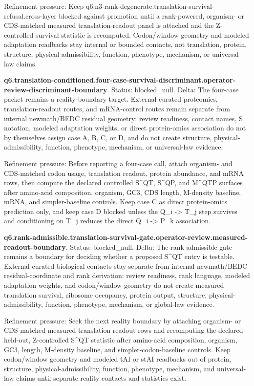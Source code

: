 Refinement pressure: Keep q6.n3-rank-degenerate.translation-survival-refusal.cross-layer blocked against promotion until a rank-powered, organism- or CDS-matched measured translation-readout panel is attached and the Z-controlled survival statistic is recomputed. Codon/window geometry and modeled adaptation readbacks stay internal or bounded contacts, not translation, protein, structure, physical-admissibility, function, phenotype, mechanism, or universal-law claims.

\textbf{q6.translation-conditioned.four-case-survival-discriminant.operator-review-discriminant-boundary}. Status: blocked\_null. Delta: The four-case packet remains a reality-boundary target. External curated proteomics, translation-readout routes, and mRNA-control routes remain separate from internal newmath/BEDC residual geometry: review readiness, contact names, S notation, modeled adaptation weights, or direct protein-omics association do not by themselves assign case A, B, C, or D, and do not create structure, physical-admissibility, function, phenotype, mechanism, or universal-law evidence.

Refinement pressure: Before reporting a four-case call, attach organism- and CDS-matched codon usage, translation readout, protein abundance, and mRNA rows, then compute the declared controlled S\textasciicircum{}QT, S\textasciicircum{}QP, and M\textasciicircum{}QTP surfaces after amino-acid composition, organism, GC3, CDS length, M-density baseline, mRNA, and simpler-baseline controls. Keep case C as direct protein-omics prediction only, and keep case D blocked unless the Q\_i -> T\_j step survives and conditioning on T\_j reduces the direct Q\_i -> P\_k association.

\textbf{q6.rank-admissible.translation-survival-gate.operator-review.measured-readout-boundary}. Status: blocked\_null. Delta: The rank-admissible gate remains a boundary for deciding whether a proposed S\textasciicircum{}QT entry is testable. External curated biological contacts stay separate from internal newmath/BEDC residual-coordinate and rank derivation: review readiness, rank language, modeled adaptation weights, and codon/window geometry do not create measured translation survival, ribosome occupancy, protein output, structure, physical-admissibility, function, phenotype, mechanism, or global-law evidence.

Refinement pressure: Seek the next reality boundary by attaching organism- or CDS-matched measured translation-readout rows and recomputing the declared held-out, Z-controlled S\textasciicircum{}QT statistic after amino-acid composition, organism, GC3, length, M-density baseline, and simpler-codon-baseline controls. Keep codon/window geometry and modeled tAI or stAI readbacks out of protein, structure, physical-admissibility, function, phenotype, mechanism, and universal-law claims until separate reality contacts and statistics exist.

